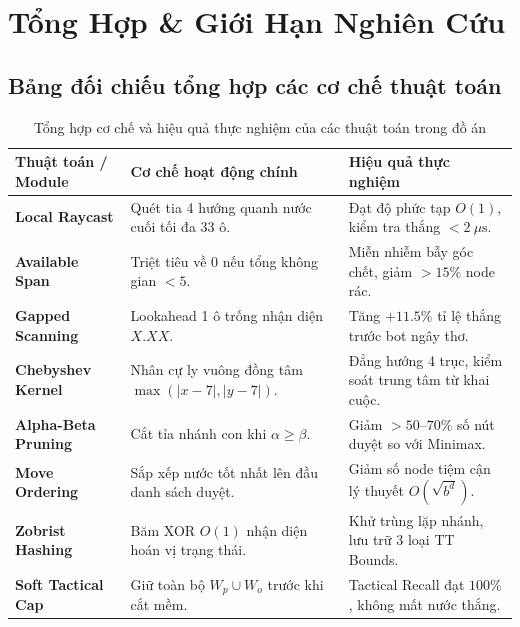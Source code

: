 \documentclass[11pt,a4paper]{report}
\begin{document}
\chapter{Tổng Hợp \& Giới Hạn Nghiên Cứu}

\section{Bảng đối chiếu tổng hợp các cơ chế thuật toán}

\begin{table}[htbp]
\centering
\small
\begin{tabularx}{\textwidth}{l X X}
\toprule
\textbf{Thuật toán / Module} & \textbf{Cơ chế hoạt động chính} & \textbf{Hiệu quả thực nghiệm} \\
\midrule
\textbf{Local Raycast} & Quét tia 4 hướng quanh nước cuối tối đa 33 ô. & Đạt độ phức tạp $O(1)$, kiểm tra thắng $< 2\ \mu\text{s}$. \\
\textbf{Available Span} & Triệt tiêu về 0 nếu tổng không gian $< 5$. & Miễn nhiễm bẫy góc chết, giảm $>15\%$ node rác. \\
\textbf{Gapped Scanning} & Lookahead 1 ô trống nhận diện $X . X X$. & Tăng $+11.5\%$ tỉ lệ thắng trước bot ngây thơ. \\
\textbf{Chebyshev Kernel} & Nhân cự ly vuông đồng tâm $\max(|x-7|, |y-7|)$. & Đẳng hướng 4 trục, kiểm soát trung tâm từ khai cuộc. \\
\textbf{Alpha-Beta Pruning} & Cắt tỉa nhánh con khi $\alpha \ge \beta$. & Giảm $>50\text{--}70\%$ số nút duyệt so với Minimax. \\
\textbf{Move Ordering} & Sắp xếp nước tốt nhất lên đầu danh sách duyệt. & Giảm số node tiệm cận lý thuyết $O(\sqrt{b^d})$. \\
\textbf{Zobrist Hashing} & Băm XOR $O(1)$ nhận diện hoán vị trạng thái. & Khử trùng lặp nhánh, lưu trữ 3 loại TT Bounds. \\
\textbf{Soft Tactical Cap} & Giữ toàn bộ $W_p \cup W_o$ trước khi cắt mềm. & Tactical Recall đạt $100\%$, không mất nước thắng. \\
\bottomrule
\end{tabularx}
\caption{Tổng hợp cơ chế và hiệu quả thực nghiệm của các thuật toán trong đồ án}
\end{table}
\end{document}
